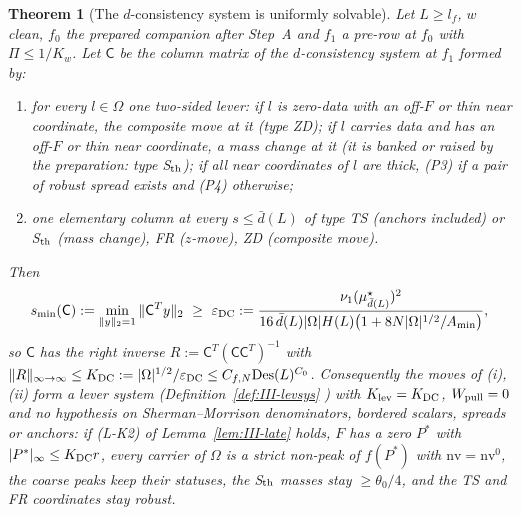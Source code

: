 \documentclass[10pt]{amsart}
\newtheorem{theorem}{Theorem}[section]
\theoremstyle{definition}
\theoremstyle{remark}
\begin{document}
\begin{theorem}[The $d$-consistency system is uniformly solvable]
\label{thm:III-SysDC}
Let $L\ge l_f$, $w$ clean, $f_0$ the prepared companion after Step~A and
$f_1$ a pre-row at $f_0$ with $\Pi\le1/K_w$.  Let $\mathsf C$ be the column
matrix of the $d$-consistency system at $f_1$ formed by:
\begin{enumerate}
\item[(i)] for every $l\in\Omega$ one two-sided lever: if $l$ is zero-data with
an off-$F$ or thin near coordinate, the composite move at it (type ZD); if
$l$ carries data and has an off-$F$ or thin near coordinate, a mass change at
it (it is banked or raised by the preparation: type S$_{\rm th}$); if all near
coordinates of $l$ are thick, (P3) if a pair of robust spread exists and (P4)
otherwise;
\item[(ii)] one elementary column at every $s\le\bar d(L)$ of type TS
(anchors included) or S$_{\rm th}$ (mass change), FR ($z$-move), ZD
(composite move).
\end{enumerate}
Then
\[
 s_{\min}(\mathsf C):=\min_{\|y\|_2=1}\|\mathsf C^Ty\|_2\ \ge\
 \varepsilon_{\rm DC}:=\frac{\nu_1(\mu^\star_{\bar d(L)})^2}{16\,\bar d(L)|\Omega|H(L)
 \big(1+8N|\Omega|^{1/2}/A_{\min}\big)},
\]
so $\mathsf C$ has the right inverse $R:=\mathsf C^T(\mathsf C\mathsf C^T)^{-1}$ with
$\|R\|_{\infty\to\infty}\le K_{\rm DC}:=|\Omega|^{1/2}/\varepsilon_{\rm DC}\le
C_{f,N}\mathrm{Des}(L)^{C_0}$.  Consequently the moves of \textup{(i)},
\textup{(ii)} form a lever system \textup{(}Definition~\textup{\ref{def:III-levsys}}%
\textup{)} with $K_{\rm lev}=K_{\rm DC}$, $W_{\rm pull}=0$ and no hypothesis on
Sherman--Morrison denominators, bordered scalars, spreads or anchors: if
\textup{(L-K2)} of Lemma~\textup{\ref{lem:III-late}} holds, $F$ has a zero
$P^*$ with $|P^*|_\infty\le K_{\rm DC}r$, every carrier of $\Omega$ is a strict
non-peak of $f(P^*)$ with $\mathrm{nv}=\mathrm{nv}^0$, the coarse peaks keep
their statuses, the S$_{\rm th}$ masses stay $\ge\theta_0/4$, and the TS and FR
coordinates stay robust.
\end{theorem}
\end{document}
